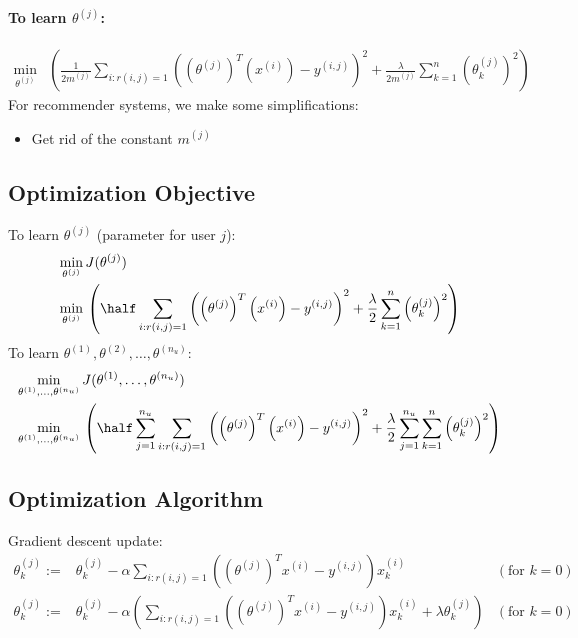 \paragraph{To learn $\theta^{(j)}$:}
\begin{align*}
	\min_{\theta^{(j)}} {} & \left(
	\frac{1}{2m^{(j)}}\sum_{i: r(i, j) = 1}\left(
		\left(\theta^{(j)}\right)^T\left(x^{(i)}\right) - y^{(i,j)}
		\right)^2 + \frac{\lambda}{2m^{(j)}}\sum_{k=1}^n\left(
		\theta_k^{(j)}
		\right)^2
	\right)
\end{align*}
For recommender systems, we make some simplifications:
\begin{itemize}
	\item Get rid of the constant $m^{(j)}$
\end{itemize}

\subsection{Optimization Objective}
To learn $\theta^{(j)}$ (parameter for user $j$):
\begin{align*}
	\min_{\theta^{(j)}} {} & J(\theta^{(j)}) \\
	\min_{\theta^{(j)}} {} & \left(
	\half\sum_{i: r(i, j) = 1}\left(
		\left(\theta^{(j)}\right)^T\left(x^{(i)}\right) - y^{(i,j)}
		\right)^2 + \frac{\lambda}{2}\sum_{k=1}^n\left(
		\theta_k^{(j)}
		\right)^2
	\right)
\end{align*}
To learn $\theta^{(1)}, \theta^{(2)}, \dots, \theta^{(n_u)}$:
\begin{align*}
	\min_{\theta^{(1)}, \dots, \theta^{(n_u)}} {} &
	J(\theta^{(1)}, \dots, \theta^{(n_u)})                 \\
	\min_{\theta^{(1)}, \dots, \theta^{(n_u)}} {} & \left(
	\half\sum_{j=1}^{n_u}\sum_{i: r(i, j) = 1}\left(
		\left(\theta^{(j)}\right)^T\left(x^{(i)}\right) - y^{(i,j)}
		\right)^2 + \frac{\lambda}{2}\sum_{j=1}^{n_u}\sum_{k=1}^n\left(
		\theta_k^{(j)}
		\right)^2
	\right)
\end{align*}

\subsection{Optimization Algorithm}
Gradient descent update:
\begin{align*}
	\theta_k^{(j)} :={} & \theta_k^{(j)} - \alpha\sum_{i:r(i, j) = 1}\left(
	\left(\theta^{(j)}\right)^Tx^{(i)} - y^{(i, j)}
	\right)x_k^{(i)} {} & (\text{for } k = 0)                               \\
	\theta_k^{(j)} :={} & \theta_k^{(j)} - \alpha\left(
	\sum_{i:r(i, j) = 1}\left(
	\left(\theta^{(j)}\right)^Tx^{(i)} - y^{(i, j)}
	\right)x_k^{(i)} + \lambda\theta_k^{(j)}
	\right) {}          & (\text{for } k = 0)
\end{align*}

